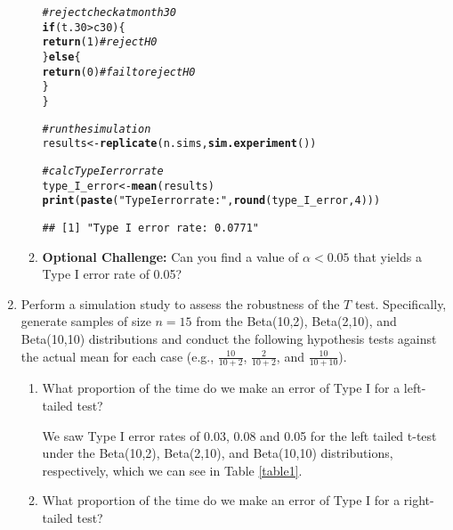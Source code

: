 \documentclass{article}\usepackage[]{graphicx}\usepackage[]{xcolor}
\makeatletter
\newcommand{\hlnum}[1]{\textcolor[rgb]{0.686,0.059,0.569}{#1}}%
\newcommand{\hlsng}[1]{\textcolor[rgb]{0.192,0.494,0.8}{#1}}%
\newcommand{\hlcom}[1]{\textcolor[rgb]{0.678,0.584,0.686}{\textit{#1}}}%
\newcommand{\hlopt}[1]{\textcolor[rgb]{0,0,0}{#1}}%
\newcommand{\hldef}[1]{\textcolor[rgb]{0.345,0.345,0.345}{#1}}%
\newcommand{\hlkwa}[1]{\textcolor[rgb]{0.161,0.373,0.58}{\textbf{#1}}}%
\newcommand{\hlkwb}[1]{\textcolor[rgb]{0.69,0.353,0.396}{#1}}%
\newcommand{\hlkwd}[1]{\textcolor[rgb]{0.737,0.353,0.396}{\textbf{#1}}}%
\newenvironment{kframe}{%
 \def\at@end@of@kframe{}%
 \ifinner\ifhmode%
  \def\at@end@of@kframe{\end{minipage}}%
  \begin{minipage}{\columnwidth}%
 \fi\fi%
 \def\FrameCommand##1{\hskip\@totalleftmargin \hskip-\fboxsep
 \colorbox{shadecolor}{##1}\hskip-\fboxsep
     \hskip-\linewidth \hskip-\@totalleftmargin \hskip\columnwidth}%
 \MakeFramed {\advance\hsize-\width
   \@totalleftmargin\z@ \linewidth\hsize
   \@setminipage}}%
 {\par\unskip\endMakeFramed%
 \at@end@of@kframe}
\newenvironment{knitrout}{}{} %
\makeatother
\begin{document}
\begin{enumerate}
\begin{enumerate}
\begin{knitrout}
\begin{kframe}
\begin{alltt}
\hlcom{#reject check at month 30}
\hlkwa{if} \hldef{(t.30} \hlopt{>} \hldef{c30) \{}
  \hlkwd{return}\hldef{(}\hlnum{1}\hldef{)}  \hlcom{#reject H0}
\hldef{\}} \hlkwa{else} \hldef{\{}
  \hlkwd{return}\hldef{(}\hlnum{0}\hldef{)}  \hlcom{#fail to reject H0}
\hldef{\}}
\hldef{\}}

\hlcom{#run the simulation}
\hldef{results} \hlkwb{<-} \hlkwd{replicate}\hldef{(n.sims,} \hlkwd{sim.experiment}\hldef{())}

\hlcom{#calc Type I error rate}
\hldef{type_I_error} \hlkwb{<-} \hlkwd{mean}\hldef{(results)}
\hlkwd{print}\hldef{(}\hlkwd{paste}\hldef{(}\hlsng{"Type I error rate:"}\hldef{,} \hlkwd{round}\hldef{(type_I_error,} \hlnum{4}\hldef{)))}
\end{alltt}
\begin{verbatim}
## [1] "Type I error rate: 0.0771"
\end{verbatim}
\end{kframe}
\end{knitrout}
  
  
  
  \item \textbf{Optional Challenge:} Can you find a value of $\alpha<0.05$ that yields a 
  Type I error rate of 0.05?
\end{enumerate}
  \item Perform a simulation study to assess the robustness of the $T$ test. 
  Specifically, generate samples of size $n=15$ from the Beta(10,2), Beta(2,10), 
  and Beta(10,10) distributions and conduct the following hypothesis tests against 
  the actual mean for each case (e.g., $\frac{10}{10+2}$, $\frac{2}{10+2}$, and 
  $\frac{10}{10+10}$). 
  \begin{enumerate}
    \item What proportion of the time do we make an error of Type I for a
    left-tailed test?
    
    We saw Type I error rates of 0.03, 0.08 and 0.05 for the left tailed t-test under the Beta(10,2), Beta(2,10), and Beta(10,10) distributions, respectively, which we can see in Table \ref{table1}.
    
    \item What proportion of the time do we make an error of Type I for a
    right-tailed test?
    

\end{enumerate}
\end{enumerate}
\end{document}
